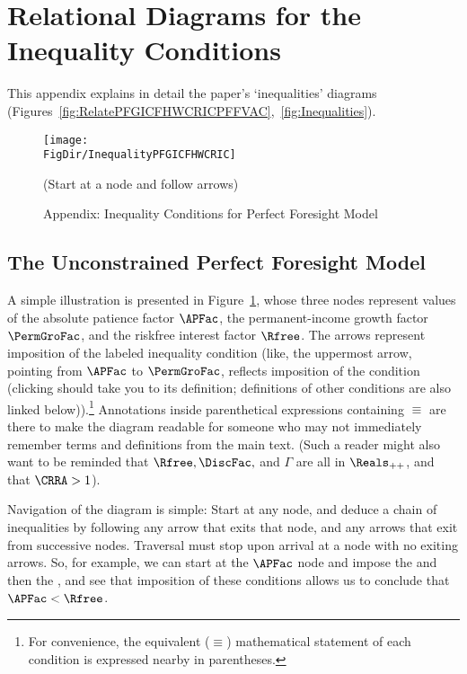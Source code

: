 \documentclass[\econtexRoot/BufferStockTheory]{subfiles}
\begin{document}
\hypertarget{ApndxConditionDiagrams}{}

\section{Relational Diagrams for the Inequality Conditions}\label{sec:ApndxConditionDiagrams}

This appendix explains in detail the paper's `inequalities' diagrams (Figures~\ref{fig:RelatePFGICFHWCRICPFFVAC},~\ref{fig:Inequalities}).

\hypertarget{InequalityPFGICFHWCRIC}{}
\begin{figure}
\centering
\texttt{[image: \\FigDir/InequalityPFGICFHWCRIC]}
\caption{Appendix: Inequality Conditions for Perfect Foresight Model}
\centerline{ (Start at a node and follow arrows)}\label{fig:InequalityPFGICFHWCRIC}
\end{figure}

\subsection{The Unconstrained Perfect Foresight Model}

A simple illustration is presented in Figure~\ref{fig:InequalityPFGICFHWCRIC}, whose three nodes represent values of the absolute patience factor $\APFac$, the permanent-income growth factor $\PermGroFac$, and the riskfree interest factor $\Rfree$.
The arrows represent imposition of the labeled inequality condition  (like,  the uppermost arrow, pointing from {$\APFac$} to $\PermGroFac$, reflects imposition of the {\GICRaw} condition (clicking {\GICRaw} should take you to its definition; definitions of other conditions are also linked below)).\footnote{For convenience, the equivalent ($\equiv$) mathematical statement of each condition is expressed nearby in parentheses.}
Annotations inside parenthetical expressions containing $\equiv$ are there to make the diagram readable for someone who may not immediately remember terms and definitions from the main text.
(Such a reader might also want to be reminded that $\Rfree, \DiscFac, $ and $\Gamma$ are all in $\Reals_{++}$, and that $\CRRA>1$).

Navigation of the diagram is simple: Start at any node, and deduce a chain of inequalities by following any arrow that exits that node, and any arrows that exit from successive nodes.
Traversal must stop upon arrival at a node with no exiting arrows.
So, for example, we can start at the $\APFac$ node and impose the {\GICRaw} and then the {\FHWC}, and see that imposition of these conditions allows us to conclude that $\APFac < \Rfree$.
\end{document}

